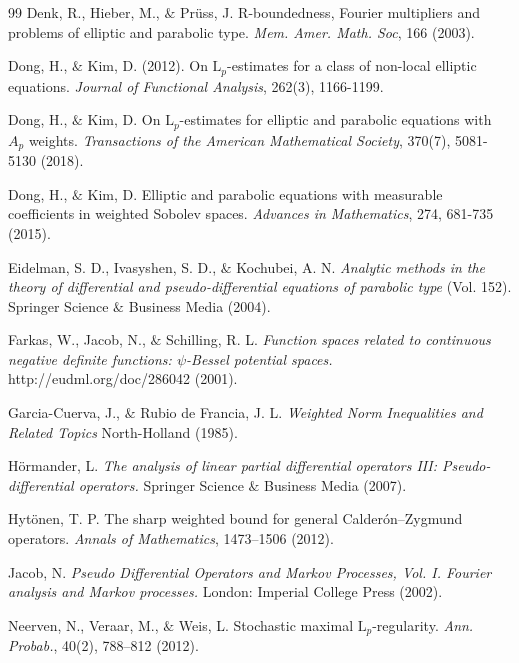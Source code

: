 \documentclass[11pt,reqno]{amsart}
\theoremstyle{definition}
\theoremstyle{remark}
\numberwithin{equation}{section}
\begin{document}
\begin{thebibliography}{99}
Denk, R., Hieber, M., $\&$ Prüss, J.
R-boundedness, Fourier multipliers and problems of elliptic and parabolic type. 
\textit{Mem. Amer. Math. Soc}, 166 (2003).


Dong, H., $\&$ Kim, D. (2012). 
On $\mathrm{L}_p$-estimates for a class of non-local elliptic equations. 
\textit{Journal of Functional Analysis}, 
262(3), 1166-1199.


Dong, H., $\&$ Kim, D.  
On $\mathrm{L}_p$-estimates for elliptic and parabolic equations with $A_p$ weights. 
\textit{Transactions of the American Mathematical Society}, 
370(7), 5081-5130 (2018).


Dong, H., $\&$ Kim, D. 
Elliptic and parabolic equations with measurable coefficients in weighted Sobolev spaces. 
\textit{Advances in Mathematics}, 274, 681-735 (2015).




Eidelman, S. D., Ivasyshen, S. D., $\&$ Kochubei, A. N.
\textit{Analytic methods in the theory of differential and pseudo-differential equations of parabolic type} (Vol. 152). 
Springer Science $\&$ Business Media  (2004). 

Farkas, W., Jacob, N., $\&$ Schilling, R. L. 
\textit{Function spaces related to continuous negative definite functions: $\psi$-Bessel potential spaces.}  
http://eudml.org/doc/286042 (2001).




Garcia-Cuerva, J., $\&$ Rubio de Francia, J. L. 
\textit{Weighted Norm Inequalities and Related Topics} 
North-Holland (1985).



Hörmander, L.  
\textit{The analysis of linear partial differential operators III: Pseudo-differential operators.}
Springer Science $\&$ Business Media (2007).


Hytönen, T. P. 
The sharp weighted bound for general Calderón--Zygmund operators. 
\textit{Annals of Mathematics}, 1473--1506 (2012). 



Jacob, N. 
\textit{Pseudo Differential Operators and Markov Processes, Vol. I. Fourier analysis and Markov processes.} 
London: Imperial College Press (2002). 


Neerven, N.,  Veraar, M., $\&$ Weis, L. 
Stochastic maximal $\mathrm{L}_p$-regularity.
\textit{Ann. Probab.}, 40(2), 788--812 (2012).



\end{thebibliography}
\end{document}
